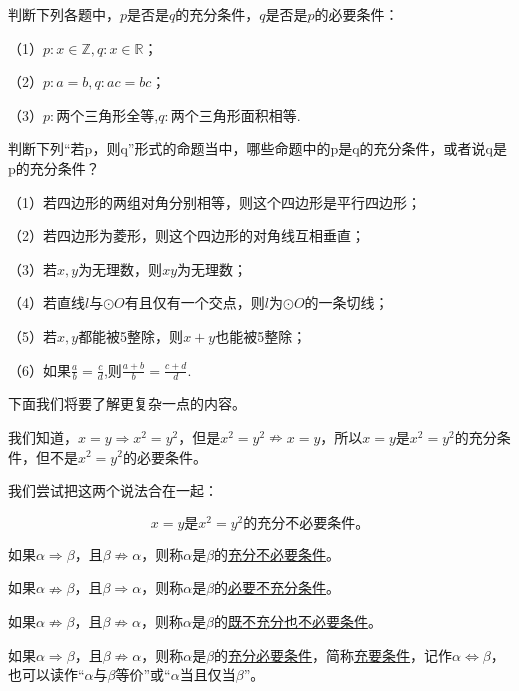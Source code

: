 \documentclass[lang=cn,math=cm,chinesefont=nofont,11pt,scheme=chinese,onecol]{elegantbook}
\begin{document}
\begin{exercise}\label{202406262010}
  判断下列各题中，$p$是否是$q$的充分条件，$q$是否是$p$的必要条件：

  （1）$p:x\in\mathbb{Z},q:x\in\mathbb{R}$；

  （2）$p:a=b,q:ac=bc$；

  （3）$p:$两个三角形全等,$q:$两个三角形面积相等.
\end{exercise}

\begin{exercise}\label{202406262101}
  判断下列“若p，则q”形式的命题当中，哪些命题中的p是q的充分条件，或者说q是p的充分条件？

  （1）若四边形的两组对角分别相等，则这个四边形是平行四边形；

  （2）若四边形为菱形，则这个四边形的对角线互相垂直；

  （3）若$x,y$为无理数，则$xy$为无理数；

  （4）若直线$l$与$\odot O$有且仅有一个交点，则$l$为$\odot O$的一条切线；

  （5）若$x,y$都能被5整除，则$x+y$也能被5整除；

  （6）如果$\frac{a}{b}=\frac{c}{d}$,则$\frac{a+b}{b}=\frac{c+d}{d}$.
\end{exercise}

\hspace*{\fill}

下面我们将要了解更复杂一点的内容。

我们知道，$x=y\Rightarrow x^2=y^2$，但是$x^2=y^2\nRightarrow x=y$，所以$x=y$是$x^2=y^2$的充分条件，但不是$x^2=y^2$的必要条件。

我们尝试把这两个说法合在一起：

$$x=y\text{是}x^2=y^2\text{的}\textbf{充分不必要条件。}$$

\begin{definition}
  如果$\alpha\Rightarrow\beta$，且$\beta\nRightarrow\alpha$，则称$\alpha$是$\beta$的\underline{充分不必要条件}。

  如果$\alpha\nRightarrow\beta$，且$\beta\Rightarrow\alpha$，则称$\alpha$是$\beta$的\underline{必要不充分条件}。

  如果$\alpha\nRightarrow\beta$，且$\beta\nRightarrow\alpha$，则称$\alpha$是$\beta$的\underline{既不充分也不必要条件}。

  如果$\alpha\Rightarrow\beta$，且$\beta\nRightarrow\alpha$，则称$\alpha$是$\beta$的\underline{充分必要条件}，简称\underline{充要条件}，记作$\alpha\Leftrightarrow\beta$，也可以读作“$\alpha$与$\beta$等价”或“$\alpha$当且仅当$\beta$”。
\end{definition}
\end{document}

